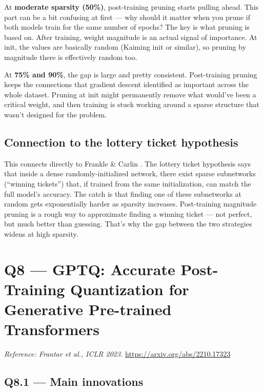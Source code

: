 \documentclass[11pt]{article}
\begin{document}
At \textbf{moderate sparsity (50\%)}, post-training pruning starts pulling ahead. This part can be a bit confusing at first --- why should it matter when you prune if both models train for the same number of epochs? The key is what pruning is based on. After training, weight magnitude is an actual signal of importance. At init, the values are basically random (Kaiming init or similar), so pruning by magnitude there is effectively random too.

At \textbf{75\% and 90\%}, the gap is large and pretty consistent. Post-training pruning keeps the connections that gradient descent identified as important across the whole dataset. Pruning at init might permanently remove what would've been a critical weight, and then training is stuck working around a sparse structure that wasn't designed for the problem.

\subsection{Connection to the lottery ticket hypothesis}

This connects directly to Frankle \& Carlin \cite{frankle2019lottery}. The lottery ticket hypothesis says that inside a dense randomly-initialized network, there exist sparse subnetworks (``winning tickets'') that, if trained from the same initialization, can match the full model's accuracy. The catch is that finding one of these subnetworks at random gets exponentially harder as sparsity increases. Post-training magnitude pruning is a rough way to approximate finding a winning ticket --- not perfect, but much better than guessing. That's why the gap between the two strategies widens at high sparsity.

\section{Q8 --- GPTQ: Accurate Post-Training Quantization for Generative Pre-trained Transformers}

\textit{Reference: Frantar et al., ICLR 2023.} \url{https://arxiv.org/abs/2210.17323}

\subsection{Q8.1 --- Main innovations}
\end{document}
